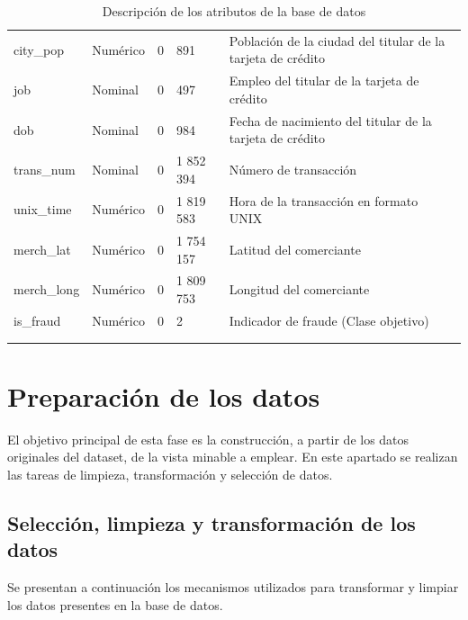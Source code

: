 \begin{longtable} {p{3.5cm} p{2cm} c p{2cm} p{6cm}}
		\addlinespace
		city\_pop & Numérico & 0 & 891 & Población de la ciudad del titular de la tarjeta de crédito \\
		\addlinespace
		job & Nominal & 0 & 497 & Empleo del titular de la tarjeta de crédito \\
		\addlinespace
		dob & Nominal & 0 & 984 & Fecha de nacimiento del titular de la tarjeta de crédito \\
		\addlinespace
		trans\_num & Nominal & 0 & 1 852 394 & Número de transacción \\
		\addlinespace
		unix\_time & Numérico & 0 & 1 819 583 & Hora de la transacción en formato UNIX \\
		\addlinespace
		merch\_lat & Numérico & 0 & 1 754 157 & Latitud del comerciante \\
		\addlinespace
		merch\_long & Numérico & 0 & 1 809 753& Longitud del comerciante \\
		\addlinespace
		is\_fraud & Numérico & 0 & 2 & Indicador de fraude (Clase objetivo)\\	
		\bottomrule 
		\\
		\caption{Descripción de los atributos de la base de datos}
		\label{tabla:descrip-atributos-bd}
	\end{longtable}


\section{Preparación de los datos}

El objetivo principal de esta fase es la construcción, a partir de los datos originales del dataset, de la vista minable a emplear. En este apartado se realizan las tareas de  limpieza, transformación y selección de datos.

\subsection{Selección, limpieza y transformación de los datos}
Se presentan a continuación los mecanismos utilizados para transformar y limpiar los datos presentes en la base de datos.

